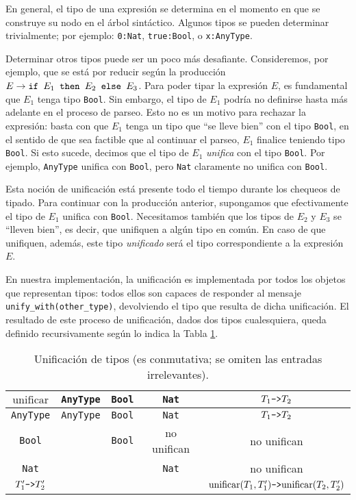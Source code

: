 \documentclass[11pt]{article}
\begin{document}
En general, el tipo de una expresión se determina en el momento en que se
construye su nodo en el árbol sintáctico. Algunos tipos se pueden determinar
trivialmente; por ejemplo: \verb|0:Nat|, \verb|true:Bool|, o 
\verb|x:AnyType|.

Determinar otros tipos puede ser un poco más desafiante. Consideremos, por
ejemplo, que se está por reducir según la producción
$E \rightarrow \verb|if | E_1 \verb| then | E_2 \verb| else | E_3$. Para
poder tipar la expresión $E$, es fundamental que $E_1$ tenga tipo
\verb|Bool|. Sin embargo, el tipo de $E_1$ podría no definirse hasta más
adelante en el proceso de parseo. Esto no es un motivo para rechazar la
expresión: basta con que $E_1$ tenga un tipo que ``se lleve bien'' con el
tipo \verb|Bool|, en el sentido de que sea factible que al continuar el
parseo, $E_1$ finalice teniendo tipo \verb|Bool|. Si esto sucede,
decimos que el tipo de $E_1$ \emph{unifica} con el tipo \verb|Bool|.
Por ejemplo, \verb|AnyType| unifica con \verb|Bool|, pero \verb|Nat|
claramente no unifica con \verb|Bool|.

Esta noción de unificación está presente todo el tiempo durante los
chequeos de tipado. Para continuar con la producción anterior, supongamos
que efectivamente el tipo de $E_1$ unifica con \verb|Bool|. Necesitamos
también que los tipos de $E_2$ y $E_3$ se ``lleven bien'', es decir, que
unifiquen a algún tipo en común. En caso de que unifiquen, además, este
tipo \emph{unificado} será el tipo correspondiente a la expresión $E$.

En nuestra implementación, la unificación es implementada por
todos los objetos que representan tipos: todos ellos son capaces de
responder al mensaje \lstinline{unify_with(other_type)}, devolviendo el tipo
que resulta de dicha unificación.
El resultado de este proceso de unificación, dados dos tipos cualesquiera,
queda definido recursivamente según lo indica la Tabla \ref{table:unificacion}.

\begin{table} \centering
\begin{tabular}{c|c|c|c|c}
$\text{unificar}$   & \verb|AnyType| & \verb|Bool| & \verb|Nat|  & $T_1\verb|->|T_2$ \\ \hline
\verb|AnyType|      & \verb|AnyType| & \verb|Bool| & \verb|Nat|  & $T_1\verb|->|T_2$ \\
\verb|Bool|         &                & \verb|Bool| & no unifican & no unifican       \\
\verb|Nat|          &                &             & \verb|Nat|  & no unifican       \\
$T'_1\verb|->|T'_2$ &                &             &             &
	$\text{unificar}(T_1,T'_1)\verb|->|\text{unificar}(T_2,T'_2)$ \\
\end{tabular}
\caption{Unificación de tipos (es conmutativa; se omiten las entradas
	irrelevantes).}
\label{table:unificacion}
\end{table}
\end{document}
